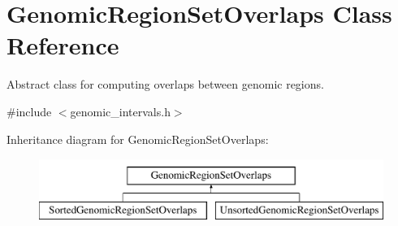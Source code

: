 \hypertarget{classGenomicRegionSetOverlaps}{
\section{GenomicRegionSetOverlaps Class Reference}
\label{classGenomicRegionSetOverlaps}
}


Abstract class for computing overlaps between genomic regions.  




{\ttfamily \#include $<$genomic\_\-intervals.h$>$}

Inheritance diagram for GenomicRegionSetOverlaps:\begin{figure}[H]
\begin{center}
\leavevmode
\includegraphics[height=2.000000cm]{classGenomicRegionSetOverlaps}
\end{center}
\end{figure}
